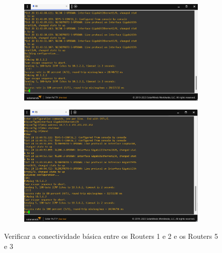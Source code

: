 \documentclass[11pt,english, openright, oneside]{book}
\begin{document}
\begin{figure}[h]
  \centering
  \begin{subfigure}{.558\textwidth}
      \centering
      \includegraphics[width=1\linewidth]{imagens/Tarefa1/3.ping_R1_R2.png}
  \end{subfigure}%
  \begin{subfigure}{.48\textwidth}
      \centering
      \includegraphics[width=1\linewidth]{imagens/Tarefa1/3.ping_R5_R3.png}
  \end{subfigure}
  \caption{Verificar a conectividade básica entre os Routers 1 e 2 e os Routers 5 e 3} 
  \label{fig:config4}
\end{figure}
\vspace{0.2cm}

\pagebreak
\end{document}

